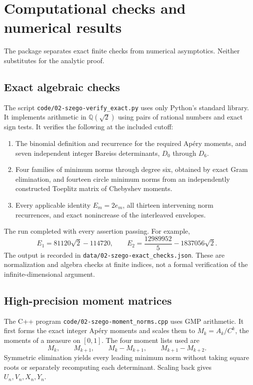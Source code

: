 \documentclass[11pt,a4paper]{article}
\numberwithin{equation}{section}
\theoremstyle{remark}\newtheorem{remark}[theorem]{Remark}
\begin{document}
\section{Computational checks and numerical results}
\label{szego:sec:computations}
The package separates exact finite checks from numerical asymptotics.
Neither substitutes for the analytic proof.

\subsection{Exact algebraic checks}
The script \texttt{code/02-szego-verify\_exact.py} uses only Python's standard library.
It implements arithmetic in $\mathbb Q(\sqrt2)$ using pairs of rational
numbers and exact sign tests. It verifies the following at the included
cutoff:
\begin{enumerate}[leftmargin=*,itemsep=2pt]
\item The binomial definition and recurrence for the required Ap\'ery moments,
and seven independent integer Bareiss determinants, $D_0$ through $D_6$.
\item Four families of minimum norms through degree six, obtained by exact
Gram elimination, and fourteen circle minimum norms from an independently
constructed Toeplitz matrix of Chebyshev moments.
\item Every applicable identity $E_m=2e_m$, all thirteen intervening norm
recurrences, and exact nonincrease of the interleaved envelopes.
\end{enumerate}
The run completed with every assertion passing.
For example,
\[
 E_1=81120\sqrt2-114720,\qquad
 E_2=\frac{12989952}{5}-1837056\sqrt2.
\]
The output is recorded in \texttt{data/02-szego-exact\_checks.json}.
These are normalization and algebra checks at finite indices, not a
formal verification of the infinite-dimensional argument.

\subsection{High-precision moment matrices}
The C++ program \texttt{code/02-szego-moment\_norms.cpp} uses GMP arithmetic.
It first forms the exact integer Ap\'ery moments and scales them to
$M_k=A_k/C^k$, the moments of a measure on $[0,1]$.
The four moment lists used are
\[
 M_k,\qquad M_{k+1},\qquad M_k-M_{k+1},\qquad M_{k+1}-M_{k+2}.
\]
Symmetric elimination yields every leading minimum norm without taking
square roots or separately recomputing each determinant.
Scaling back gives $U_n,V_n,X_n,Y_n$.
\end{document}
